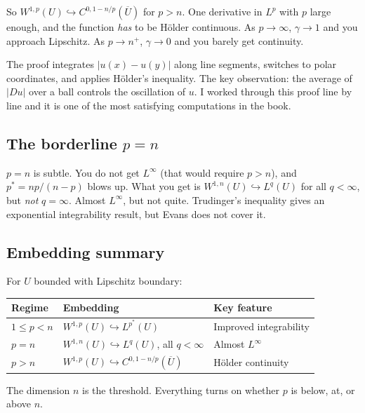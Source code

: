 So $W^{1,p}(U) \hookrightarrow C^{0,1-n/p}(\overline{U})$ for $p > n$. One derivative in $L^p$ with $p$ large enough, and the function \emph{has} to be H\"older continuous. As $p \to \infty$, $\gamma \to 1$ and you approach Lipschitz. As $p \to n^+$, $\gamma \to 0$ and you barely get continuity.

The proof integrates $|u(x) - u(y)|$ along line segments, switches to polar coordinates, and applies H\"older's inequality. The key observation: the average of $|Du|$ over a ball controls the oscillation of $u$. I worked through this proof line by line and it is one of the most satisfying computations in the book.


\subsection{The borderline $p = n$}

$p = n$ is subtle. You do not get $L^\infty$ (that would require $p > n$), and $p^* = np/(n-p)$ blows up. What you get is $W^{1,n}(U) \hookrightarrow L^q(U)$ for all $q < \infty$, but \emph{not} $q = \infty$. Almost $L^\infty$, but not quite. Trudinger's inequality gives an exponential integrability result, but Evans does not cover it.


\subsection{Embedding summary}

For $U$ bounded with Lipschitz boundary:
\begin{center}
\renewcommand{\arraystretch}{1.3}
\begin{tabular}{lll}
    \toprule
    \textbf{Regime} & \textbf{Embedding} & \textbf{Key feature} \\
    \midrule
    $1 \leq p < n$ & $W^{1,p}(U) \hookrightarrow L^{p^*}(U)$ & Improved integrability \\
    $p = n$ & $W^{1,n}(U) \hookrightarrow L^q(U)$, all $q < \infty$ & Almost $L^\infty$ \\
    $p > n$ & $W^{1,p}(U) \hookrightarrow C^{0,1-n/p}(\overline{U})$ & H\"older continuity \\
    \bottomrule
\end{tabular}
\end{center}

The dimension $n$ is the threshold. Everything turns on whether $p$ is below, at, or above $n$.



